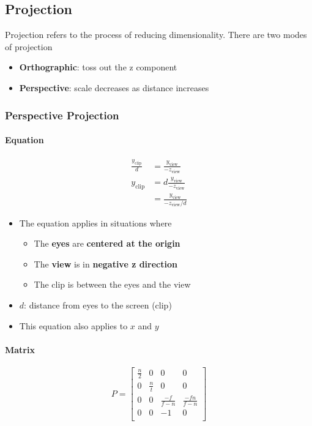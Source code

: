   \subsection{Projection}

    Projection refers to the process of reducing dimensionality. There are two
    modes of projection

    \begin{itemize}
      \item \textbf{Orthographic}: toss out the z component
      \item \textbf{Perspective}: scale decreases as distance increases
    \end{itemize}

    \subsubsection{Perspective Projection}

      \paragraph{Equation}
      \begin{align}
        \frac{y_{\text{clip}}}{d} &= \frac{y_{\text{view}}}{-z_{\text{view}}} \\
        y_{\text{clip}}
        &= d\frac{y_ {\text{view}}}{-z_{\text{view}}} \\
        &= \frac{y_{\text{view}}}{-z_{\text{view}} / d}
      \end{align}

      \begin{itemize}
        \item The equation applies in situations where
        \begin{itemize}
          \item The \textbf{eyes} are \textbf{centered at the origin}
          \item The \textbf{view} is in \textbf{negative z direction}
          \item The clip is between the eyes and the view
        \end{itemize}

        \item $ d $: distance from eyes to the screen (clip)
        \item This equation also applies to $ x $ and $ y $
      \end{itemize}

      \paragraph{Matrix}
      \begin{equation}
        P =
        \begin{bmatrix}
          \frac{n}{2} & 0 & 0 & 0 \\
          0 & \frac{n}{t} & 0 & 0 \\
          0 & 0 & \frac{-f}{f - n} & \frac{-fn}{f - n} \\
          0 & 0 & -1 & 0 \\
        \end{bmatrix}
      \end{equation}

